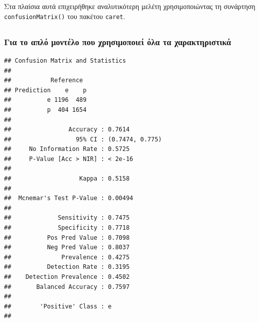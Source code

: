 \documentclass[
]{article}
\newenvironment{Shaded}{\begin{snugshade}}{\end{snugshade}}
\newcommand{\FunctionTok}[1]{\textcolor[rgb]{0.13,0.29,0.53}{\textbf{#1}}}
\newcommand{\NormalTok}[1]{#1}
\newcommand{\SpecialCharTok}[1]{\textcolor[rgb]{0.81,0.36,0.00}{\textbf{#1}}}
\begin{document}
Στα πλαίσια αυτά επιχειρήθηκε αναλυτικότερη μελέτη χρησιμοποιώντας τη
συνάρτηση \texttt{confusionMatrix()} του πακέτου \texttt{caret}.

\subsection*{}\label{section-2}

\subsubsection*{Για το απλό μοντέλο που χρησιμοποιεί όλα τα
χαρακτηριστικά}\label{ux3b3ux3b9ux3b1-ux3c4ux3bf-ux3b1ux3c0ux3bbux3cc-ux3bcux3bfux3bdux3c4ux3adux3bbux3bf-ux3c0ux3bfux3c5-ux3c7ux3c1ux3b7ux3c3ux3b9ux3bcux3bfux3c0ux3bfux3b9ux3b5ux3af-ux3ccux3bbux3b1-ux3c4ux3b1-ux3c7ux3b1ux3c1ux3b1ux3baux3c4ux3b7ux3c1ux3b9ux3c3ux3c4ux3b9ux3baux3ac}

\begin{Shaded}
\end{Shaded}

\begin{verbatim}
## Confusion Matrix and Statistics
## 
##           Reference
## Prediction    e    p
##          e 1196  489
##          p  404 1654
##                                          
##                Accuracy : 0.7614         
##                  95% CI : (0.7474, 0.775)
##     No Information Rate : 0.5725         
##     P-Value [Acc > NIR] : < 2e-16        
##                                          
##                   Kappa : 0.5158         
##                                          
##  Mcnemar's Test P-Value : 0.00494        
##                                          
##             Sensitivity : 0.7475         
##             Specificity : 0.7718         
##          Pos Pred Value : 0.7098         
##          Neg Pred Value : 0.8037         
##              Prevalence : 0.4275         
##          Detection Rate : 0.3195         
##    Detection Prevalence : 0.4502         
##       Balanced Accuracy : 0.7597         
##                                          
##        'Positive' Class : e              
## 
\end{verbatim}
\end{document}
